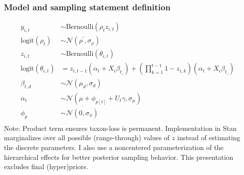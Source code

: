 \documentclass{beamer}
\begin{document}
\begin{frame}
  \frametitle{Model and sampling statement definition}
  \footnotesize{
    \begin{align*}
      y_{i,t} &\sim \text{Bernoulli}(\rho_{t} z_{i,t}) \\
      \text{logit}(\rho_{t}) &\sim \mathcal{N}(\rho^{'}, \sigma_{\rho}) \\
      z_{i,t} &\sim \text{Bernoulli}(\theta_{i, t}) \\
      \text{logit}(\theta_{i, t}) &= z_{i,t-1} (\alpha_{t} + X_{i} \beta_{t\_}) + (\prod_{k = 1}^{t-1} 1 - z_{i,k}) (\alpha_{t} + X_{i} \beta_{t\_}) \\
      \beta_{t,d} &\sim \mathcal{N}(\mu_{d}, \sigma_{d}) \\
      \alpha_{t} &\sim \mathcal{N}(\mu + \phi_{p[t]} + U_{t} \gamma, \sigma_{\mu}) \\
      \phi_{p} &\sim \mathcal{N}(0, \sigma_{\phi}) \\
    \end{align*}
  }
  \scriptsize{Note: Product term ensures taxon-loss is permanent. Implementation in Stan marginalizes over all possible (range-through) values of \(z\) instead of estimating the discrete parameters. I also use a noncentered parameterization of the hierarchical effects for better posterior sampling behavior. This presentation excludes final (hyper)priors.}
\end{frame}
\end{document}
